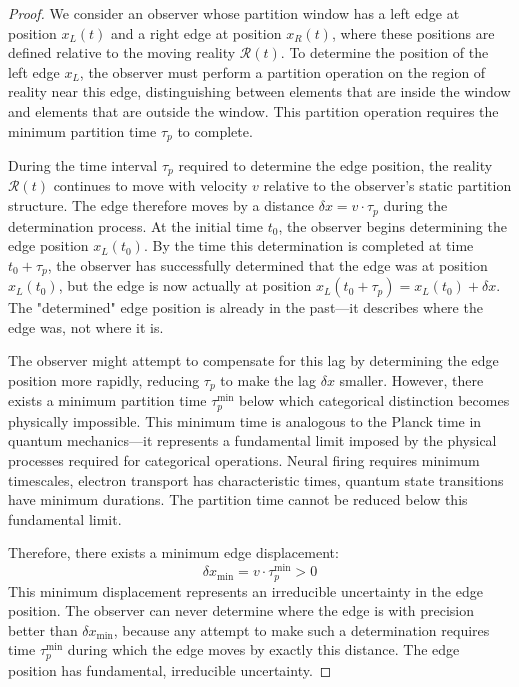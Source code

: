 \documentclass[12pt,a4paper]{article}
\theoremstyle{definition}
\theoremstyle{remark}
\begin{document}
\begin{proof}
We consider an observer whose partition window has a left edge at position $x_L(t)$ and a right edge at position $x_R(t)$, where these positions are defined relative to the moving reality $\mathcal{R}(t)$. To determine the position of the left edge $x_L$, the observer must perform a partition operation on the region of reality near this edge, distinguishing between elements that are inside the window and elements that are outside the window. This partition operation requires the minimum partition time $\tau_p$ to complete.

During the time interval $\tau_p$ required to determine the edge position, the reality $\mathcal{R}(t)$ continues to move with velocity $v$ relative to the observer's static partition structure. The edge therefore moves by a distance $\delta x = v \cdot \tau_p$ during the determination process. At the initial time $t_0$, the observer begins determining the edge position $x_L(t_0)$. By the time this determination is completed at time $t_0 + \tau_p$, the observer has successfully determined that the edge was at position $x_L(t_0)$, but the edge is now actually at position $x_L(t_0 + \tau_p) = x_L(t_0) + \delta x$. The "determined" edge position is already in the past—it describes where the edge was, not where it is.

The observer might attempt to compensate for this lag by determining the edge position more rapidly, reducing $\tau_p$ to make the lag $\delta x$ smaller. However, there exists a minimum partition time $\tau_p^{\min}$ below which categorical distinction becomes physically impossible. This minimum time is analogous to the Planck time in quantum mechanics—it represents a fundamental limit imposed by the physical processes required for categorical operations. Neural firing requires minimum timescales, electron transport has characteristic times, quantum state transitions have minimum durations. The partition time cannot be reduced below this fundamental limit.

Therefore, there exists a minimum edge displacement:
\begin{equation}
    \delta x_{\min} = v \cdot \tau_p^{\min} > 0
\end{equation}
This minimum displacement represents an irreducible uncertainty in the edge position. The observer can never determine where the edge is with precision better than $\delta x_{\min}$, because any attempt to make such a determination requires time $\tau_p^{\min}$ during which the edge moves by exactly this distance. The edge position has fundamental, irreducible uncertainty.
\end{proof}
\end{document}
